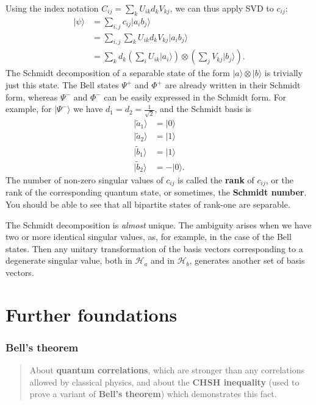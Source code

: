 \documentclass[fleqn,a4paper]{article}
\let\oldsection\section
\renewcommand\section{\clearpage\oldsection}
\let\oldpart\part
\renewcommand\part{\clearpage\oldpart}
\theoremstyle{definition}
\theoremstyle{definition}
\theoremstyle{definition}
\theoremstyle{definition}
\theoremstyle{remark}
\begin{document}
Using the index notation \(C_{ij} = \sum_k U_{ik}d_k V_{kj}\), we can thus apply SVD to \(c_{ij}\):
\[
  \begin{aligned}
    |\psi\rangle
    &= \sum_{i,j} c_{ij}|a_ib_j\rangle
  \\&= \sum_{i,j} \sum_k U_{ik}d_k V_{kj}|a_ib_j\rangle
  \\&= \sum_k d_k \left(\sum_i U_{ik}|a_i\rangle\right)\otimes\left(\sum_j V_{kj}|b_j\rangle\right).
  \end{aligned}
\]
The Schmidt decomposition of a separable state of the form
\(|a\rangle\otimes|b\rangle\) is trivially just this state.
The Bell states \(\Psi^+\) and \(\Phi^+\) are already written in their Schmidt form, whereas \(\Psi^-\) and \(\Phi^-\) can be easily expressed in the Schmidt form.
For example, for \(|\Psi^-\rangle\) we have \(d_1 = d_2 = \frac{1}{\sqrt{2}}\), and the Schmidt basis is
\[
  \begin{aligned}
    |\tilde{a}_1\rangle &= |0\rangle
  \\|\tilde{a}_2\rangle &= |1\rangle
  \\|\tilde{b}_1\rangle &= |1\rangle
  \\|\tilde{b}_2\rangle &= -|0\rangle.
  \end{aligned}
\]
The number of non-zero singular values of \(c_{ij}\) is called the \textbf{rank} of \(c_{ij}\), or the rank of the corresponding quantum state, or sometimes, the \textbf{Schmidt number}.
You should be able to see that all bipartite states of rank-one are separable.

The Schmidt decomposition is \emph{almost} unique.
The ambiguity arises when we have two or more identical singular values, as, for example, in the case of the Bell states.
Then any unitary transformation of the basis vectors corresponding to a degenerate singular value, both in \(\mathcal{H}_a\) and in \(\mathcal{H}_b\), generates another set of basis vectors.

\hypertarget{part-further-foundations}{%
\part{Further foundations}\label{part-further-foundations}}

\hypertarget{bells-theorem}{%
\section{Bell's theorem}\label{bells-theorem}}

\begin{quote}
About \textbf{quantum correlations}, which are stronger than any correlations allowed by classical physics, and about the \textbf{CHSH inequality} (used to prove a variant of \textbf{Bell's theorem}) which demonstrates this fact.
\end{quote}
\end{document}
